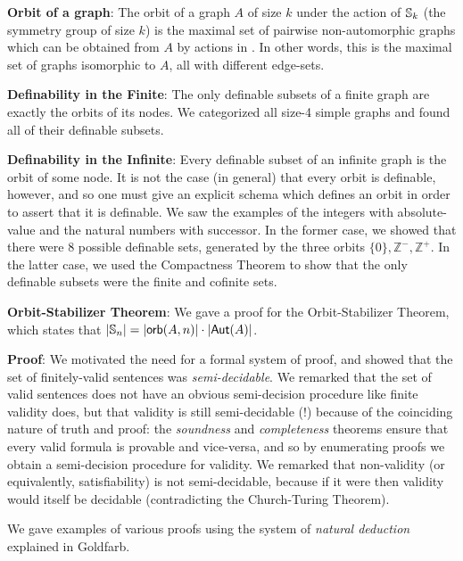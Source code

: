 \begin{mdframed}[linewidth=1]
\textbf{Orbit of a graph}: The orbit of a graph $A$ of size $k$ under the action of $\mbox{$\mathbb{S}_{k}$}$ (the symmetry group of size $k$) is the maximal set of pairwise non-automorphic graphs which can be obtained from $A$ by actions in . In other words, this is the maximal set of graphs isomorphic to $A$, all with different edge-sets. 

\textbf{Definability in the Finite}: The only definable subsets of a finite graph are exactly the orbits of its nodes. We categorized all size-4 simple graphs and found all of their definable subsets. 

\textbf{Definability in the Infinite}: Every definable subset of an infinite graph is the orbit of some node. It is not the case (in general) that every orbit is definable, however, and so one must give an explicit schema which defines an orbit in order to assert that it is definable. We saw the examples of the integers with absolute-value and the natural numbers with successor. In the former case, we showed that there were $8$ possible definable sets, generated by the three orbits $\{0\}, \mathbb{Z}^{-}, \mathbb{Z}^{+}$. In the latter case, we used the Compactness Theorem to show that the only definable subsets were the finite and cofinite sets. 

\textbf{Orbit-Stabilizer Theorem}: We gave a proof for the Orbit-Stabilizer Theorem, which states that $|\mbox{$\mathbb{S}_{n}$}| = |\mbox{$\mathsf{orb}(A,n)$}| \cdot |\mbox{$\mathsf{Aut}(A)$}|$. 

\textbf{Proof}: We motivated the need for a formal system of proof, and showed that the set of finitely-valid sentences was \emph{semi-decidable}. We remarked that the set of valid sentences does not have an obvious semi-decision procedure like finite validity does, but that validity is still semi-decidable (!) because of the coinciding nature of truth and proof: the \emph{soundness} and \emph{completeness} theorems ensure that every valid formula is provable and vice-versa, and so by enumerating proofs we obtain a semi-decision procedure for validity. We remarked that non-validity (or equivalently, satisfiability) is not semi-decidable, because if it were then validity would itself be decidable (contradicting the Church-Turing Theorem). 

We gave examples of various proofs using the system of \emph{natural deduction} explained in Goldfarb. 
\end{mdframed}



